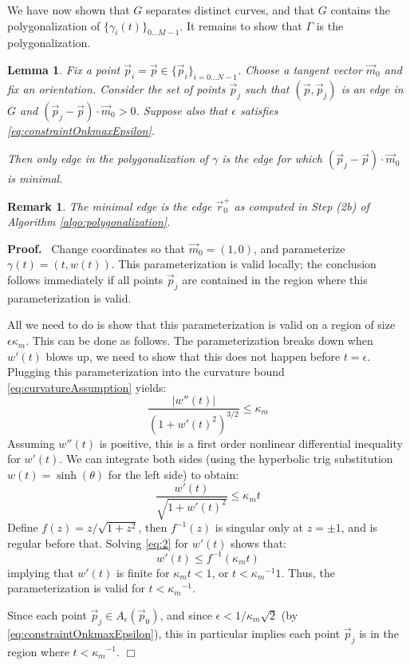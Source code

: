 \documentclass{article}
\newtheorem{varremark}[cntr]{Remark}
\newenvironment{remark}{\begin{varremark}\em}{\em\end{varremark}}
\newenvironment{proof}{
  \noindent\textbf{Proof.}\ }{\hspace*{\fill}
  \begin{math}\Box\end{math}\medskip}
\newtheorem{lemma}[cntr]{Lemma}
\numberwithin{cntr}{section}
\numberwithin{equation}{section}
\newcommand{\abs}[1]{\left| #1 \right|}%
\newcommand{\vp}[0]{{\vec{p}}}
\newcommand{\vr}[0]{{\vec{r}}}
\newcommand{\vm}[0]{{\vec{m}}}
\newcommand{\Oto}[1]{{0 \ldots #1-1}}
\newcommand{\OtoN}{{0 \ldots N-1}}
\newcommand{\pointData}{{ \{ \vp_{i} \}_{i=\OtoN} }}
\newcommand{\curveSet}{{ \{ \gamma_i(t) \}_{\Oto{M}}}}
\newcommand{\allowed}[2]{ { A_{#1}(#2) } }
\newcommand{\curvemax}{{\kappa_{m}}}
\newcommand{\curvemaxi}{{\curvemax^{-1}}}
\begin{document}
We have now shown that $G$ separates distinct curves, and that $G$ contains the polygonalization of $\curveSet$. It remains to show that $\Gamma$ is the polygonalization.

\begin{lemma}
  \label{lem:closestTangentPointInAllowedRegionIsCorrect}
  Fix a point $\vp_{i}=\vp \in \pointData$. Choose a tangent vector $\vm_{0}$ and fix an orientation. Consider the set of points $\vp_{j}$ such that $(\vp, \vp_{j})$ is an edge in $G$ and $(\vp_{j} - \vp) \cdot \vm_{0} > 0$. Suppose also that $\epsilon$ satisfies \eqref{eq:constraintOnkmaxEpsilon}.

  Then only edge in the polygonalization of $\gamma$ is the edge for which $(\vp_{j} - \vp) \cdot \vm_{0}$ is minimal.
\end{lemma}

\begin{remark}
  The minimal edge is the edge $\vr^{+}_{0}$ as computed in Step (2b) of Algorithm \ref{algo:polygonalization}.
\end{remark}

\begin{proof}
  Change coordinates so that $\vm_{0} = (1,0)$, and parameterize $\gamma(t)=(t,w(t))$. This parameterization is valid locally; the conclusion follows immediately if all points $\vp_{j}$ are contained in the region where this parameterization is valid.

  All we need to do is show that this parameterization is valid on a region of size $\epsilon \curvemax$. This can be done as follows. The parameterization breaks down when $w'(t)$ blows up, we need to show that this does not happen before $t=\epsilon$. Plugging this parameterization into the curvature bound \eqref{eq:curvatureAssumption} yields:
  \begin{equation*}
    \frac{ \abs{w''(t)} }{(1+w'(t)^{2})^{3/2}} \leq \curvemax
  \end{equation*}
  Assuming $w''(t)$ is positive, this is a first order nonlinear differential inequality for $w'(t)$. We can integrate both sides (using the hyperbolic trig substitution $w(t)=\sinh(\theta)$ for the left side) to obtain:
  \begin{equation}
    \label{eq:2}
    \frac{w'(t)}{\sqrt{1+w'(t)^{2}}} \leq \curvemax t
  \end{equation}
  Define $f(z)=z/\sqrt{1+z^{2}}$, then $f^{-1}(z)$ is singular only at $z=\pm 1$, and is regular before that. Solving \eqref{eq:2} for $w'(t)$ shows that:
  \begin{equation*}
    w'(t) \leq f^{-1}(\curvemax t)
  \end{equation*}
  implying that $w'(t)$ is finite for $\curvemax t < 1$, or $t < \curvemaxi 1$. Thus, the parameterization is valid for $t < \curvemaxi$.

  Since each point $\vp_{j} \in \allowed{\epsilon}{\vp_{0}}$, and since $\epsilon < 1/\curvemax \sqrt{2}$ (by \eqref{eq:constraintOnkmaxEpsilon}), this in particular implies each point $\vp_{j}$ is in the region where $t < \curvemaxi$.
\end{proof}
\end{document}
